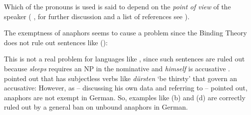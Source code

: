 \documentclass[output=paper,biblatex,babelshorthands,newtxmath,draftmode,colorlinks,citecolor=brown]{langscibook}
\begin{document}
\noindent
Which of the pronouns is used is said to depend on the \emph{point of view} of the speaker
(%
\citealp{Kuroda1973a-u}, for further discussion and a list of references see \citealp[]{ps2}).


The exemptness of anaphors seems to cause a problem since the Binding Theory does not rule out sentences like ():
\z
{}

This is not a real problem for languages like , since such sentences are ruled out because \emph{sleeps}
requires an NP in the nominative and \emph{himself} is accusative \parencites[]{Brame77}[]{ps2}.
\citet[Section~20.4.6]{Mueller99a} pointed out that  has subjectless verbs like
\emph{dürsten} `be thirsty' that govern an accusative:
\eal
{}
\zl
However, as \citet[, 161]{Kiss2012a} -- discussing his own data and referring to
\citet[]{Frey93a} -- pointed out, anaphors are not exempt in German. So, examples like
(b) and (d) are correctly ruled out by a general ban on unbound anaphors in German.
\end{document}
